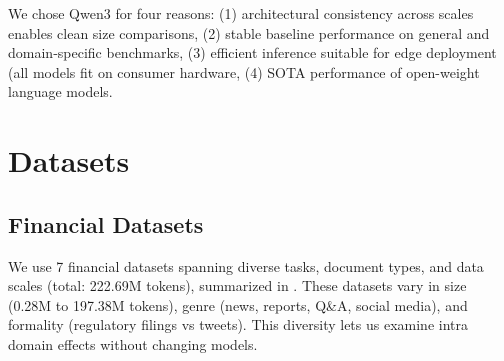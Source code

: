 We chose Qwen3 for four reasons: (1) architectural consistency across scales enables clean size comparisons, (2) stable baseline performance on general and domain‑specific benchmarks, (3) efficient inference suitable for edge deployment (all models fit on consumer hardware, (4) SOTA performance of open-weight language models.

\section{Datasets}

\subsection{Financial Datasets}

We use 7 financial datasets spanning diverse tasks, document types, and data scales (total: 222.69M tokens), summarized in . These datasets vary in size (0.28M to 197.38M tokens), genre (news, reports, Q\&A, social media), and formality (regulatory filings vs tweets). This diversity lets us examine intra domain effects without changing models.

